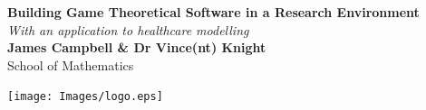\documentclass[a0,landscape]{a0poster}
\begin{document}
\begin{minipage}[b]{0.7\linewidth}
\veryHuge \color{NavyBlue} \textbf{Building Game Theoretical Software in a Research Environment} \color{Black}\\ %
\Huge\textit{With an application to healthcare modelling}\\[1cm] %
\huge \textbf{James Campbell \& Dr Vince(nt) Knight}\\ %
\huge School of Mathematics\\ %
\end{minipage}
%
%
\begin{minipage}[b]{0.3\linewidth}
\centering
\texttt{[image: Images/logo.eps]}
\end{minipage}

\vspace{1cm}
\end{document}
